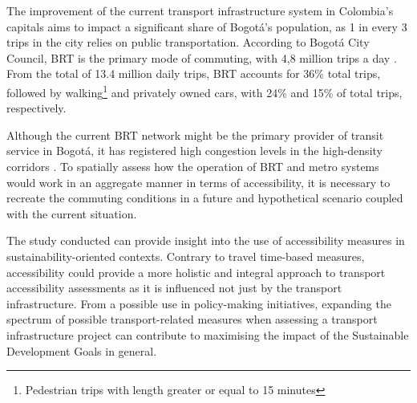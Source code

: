 \documentclass[12pt, a4paper]{report}
\begin{document}
The improvement of the current transport infrastructure system in Colombia's capitals aims to impact a significant share of Bogot\'{a}'s population, as 1 in every 3 trips in the city relies on public transportation. According to Bogot\'{a} City Council, BRT is the primary mode of commuting, with 4,8 million trips a day \citep{alcaldiadebogotad.c.EncuestaMovilidad20192019}. From the total of 13.4 million daily trips, BRT accounts for 36\% total trips, followed by walking\footnote{Pedestrian trips with length greater or equal to 15 minutes} and privately owned cars, with 24\% and 15\% of total trips, respectively.

Although the current BRT network might be the primary provider of transit service in Bogotá, it has registered high congestion levels in the high-density corridors \citep{guzmanDensityorientedPublicTransport2021}. To spatially assess how the operation of BRT and metro systems would work in an aggregate manner in terms of accessibility, it is necessary to recreate the commuting conditions in a future and hypothetical scenario coupled with the current situation.

The study conducted can provide insight into the use of accessibility measures in sustainability-oriented contexts. Contrary to travel time-based measures, accessibility could provide a more holistic and integral approach to transport accessibility assessments as it is influenced not just by the transport infrastructure. From a possible use in policy-making initiatives, expanding the spectrum of possible transport-related measures when assessing a transport infrastructure project can contribute to maximising the impact of the Sustainable Development Goals in general.



\end{document}

